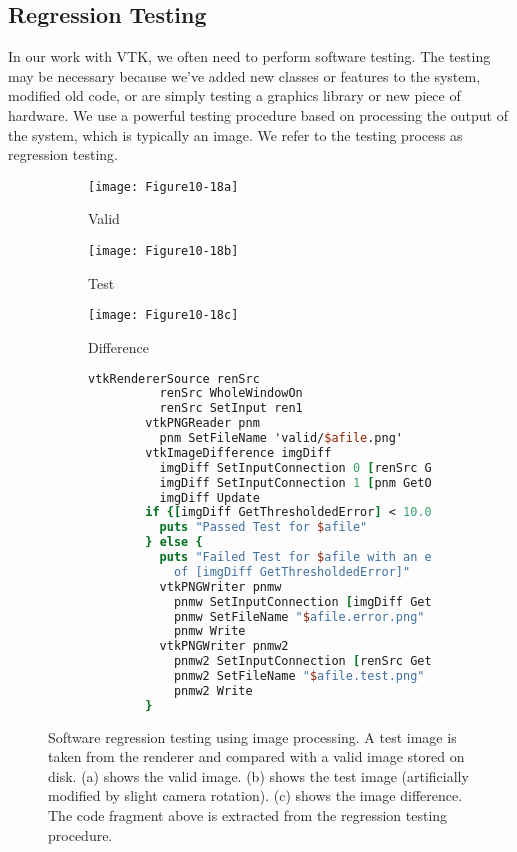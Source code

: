 \subsection{Regression Testing}

In our work with VTK, we often need to perform software testing. The testing may be necessary because we’ve added new classes or features to the system, modified old code, or are simply testing a graphics library or new piece of hardware. We use a powerful testing procedure based on processing the output of the system, which is typically an image. We refer to the testing process as regression testing.

\begin{figure}[htb]
    \centering
	\begin{subfigure}[h]{0.32\linewidth}
		\texttt{[image: Figure10-18a]}
		\captionsetup{justification=centering}
		\caption*{Valid}
		\label{fig:Figure10-18a}
	\end{subfigure}
	\hfill
	\begin{subfigure}[h]{0.32\linewidth}
		\texttt{[image: Figure10-18b]}
		\captionsetup{justification=centering}
		\caption*{Test}
        \label{fig:Figure10-18b}
	\end{subfigure}
	\hfill
	\begin{subfigure}[h]{0.32\linewidth}
		\texttt{[image: Figure10-18c]}
		\captionsetup{justification=centering}
		\caption*{Difference}
        \label{fig:Figure10-18c}
	\end{subfigure}
	\hfill
	\begin{subfigure}[h]{0.96\linewidth}
       \begin{lstlisting}[language=TCL,  caption={}, numbers=none, frame=none]
        vtkRendererSource renSrc
          renSrc WholeWindowOn
          renSrc SetInput ren1
        vtkPNGReader pnm
          pnm SetFileName 'valid/$afile.png'
        vtkImageDifference imgDiff
          imgDiff SetInputConnection 0 [renSrc GetOutputPort]
          imgDiff SetInputConnection 1 [pnm GetOutputPort]
          imgDiff Update
        if {[imgDiff GetThresholdedError] < 10.0} {
          puts "Passed Test for $afile"
        } else {
          puts "Failed Test for $afile with an error \
            of [imgDiff GetThresholdedError]"
          vtkPNGWriter pnmw
            pnmw SetInputConnection [imgDiff GetOutputPort]
            pnmw SetFileName "$afile.error.png"
            pnmw Write
          vtkPNGWriter pnmw2
            pnmw2 SetInputConnection [renSrc GetOutputPort]
            pnmw2 SetFileName "$afile.test.png"
            pnmw2 Write
        }
        \end{lstlisting}
        \label{fig:Figure10-18d}
	\end{subfigure}
	\caption{Software regression testing using image processing. A test image is taken from the renderer and compared with a valid image stored on disk. (a) shows the valid image. (b) shows the test image (artificially modified by slight camera rotation). (c) shows the image difference. The code fragment above is extracted from the regression testing procedure.}\label{fig:Figure10-18}
\end{figure}

